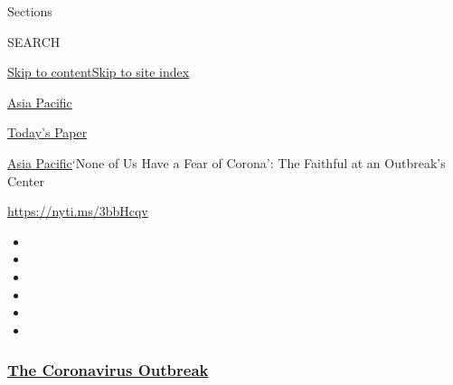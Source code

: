 Sections

SEARCH

\protect\hyperlink{site-content}{Skip to
content}\protect\hyperlink{site-index}{Skip to site index}

\href{https://www.nytimes3xbfgragh.onion/section/world/asia}{Asia
Pacific}

\href{https://myaccount.nytimes3xbfgragh.onion/auth/login?response_type=cookie\&client_id=vi}{}

\href{https://www.nytimes3xbfgragh.onion/section/todayspaper}{Today's
Paper}

\href{/section/world/asia}{Asia Pacific}\textbar{}`None of Us Have a
Fear of Corona': The Faithful at an Outbreak's Center

\url{https://nyti.ms/3bbHcqv}

\begin{itemize}
\item
\item
\item
\item
\item
\item
\end{itemize}

\hypertarget{the-coronavirus-outbreak}{%
\subsubsection{\texorpdfstring{\href{https://www.nytimes3xbfgragh.onion/news-event/coronavirus?name=styln-coronavirus-national\&region=TOP_BANNER\&block=storyline_menu_recirc\&action=click\&pgtype=Article\&impression_id=df21ec90-f52c-11ea-868d-8bbf3a530245\&variant=undefined}{The
Coronavirus
Outbreak}}{The Coronavirus Outbreak}}\label{the-coronavirus-outbreak}}

